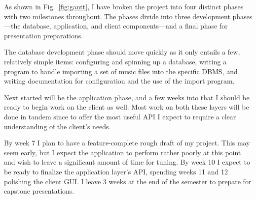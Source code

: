\documentclass{abrice}
\begin{document}
\noindent
As shown in Fig.~\ref{fig:gantt}, I have broken the project into four distinct
phases with two milestones throughout. The phases divide into three development
phases---the database, application, and client components---and a final phase
for presentation preparations.

The database development phase should move quickly as it only entails a few,
relatively simple items: configuring and spinning up a database, writing a
program to handle importing a set of music files into the specific DBMS, and
writing documentation for configuration and the use of the import program.

Next started will be the application phase, and a few weeks into that I should
be ready to begin work on the client as well. Most work on both these layers
will be done in tandem since to offer the most useful API I expect to require a
clear understanding of the client's needs.

By week 7 I plan to have a feature-complete rough draft of my project. This may
seem early, but I expect the application to perform rather poorly at this point
and wish to leave a significant amount of time for tuning. By week 10 I expect
to be ready to finalize the application layer's API, spending weeks 11 and 12
polishing the client GUI\@. I leave 3 weeks at the end of the semester to
prepare for capstone presentations.

\printbibliography%
\end{document}
